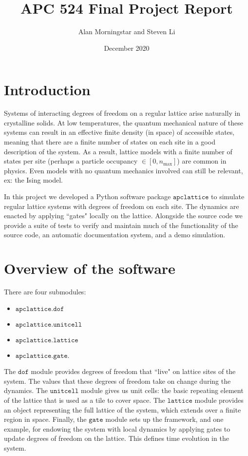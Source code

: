 \documentclass{article}
\title{APC 524 Final Project Report}
\author{Alan Morningstar and Steven Li}
\date{December 2020}
\begin{document}
\maketitle

\section{Introduction}

Systems of interacting degrees of freedom on a regular lattice arise naturally in crystalline solids. At low temperatures, the quantum mechanical nature of these systems can result in an effective finite density (in space) of accessible states, meaning that there are a finite number of states on each site in a good description of the system. As a result, lattice models with a finite number of states per site (perhaps a particle occupancy $\in [0, n_\mathrm{max}]$) are common in physics. Even models with no quantum mechanics involved can still be relevant, ex: the Ising model.

In this project we developed a Python software package $\texttt{apclattice}$ to simulate regular lattice systems with degrees of freedom on each site. The dynamics are enacted by applying ``gates" locally on the lattice. Alongside the source code we provide a suite of tests to verify and maintain much of the functionality of the source code, an automatic documentation system, and a demo simulation.

\section{Overview of the software}
There are four submodules:
\begin{itemize}
    \item $\texttt{apclattice.dof}$\\
    \item $\texttt{apclattice.unitcell}$\\
    \item $\texttt{apclattice.lattice}$\\
    \item $\texttt{apclattice.gate}$.
\end{itemize}
The $\texttt{dof}$ module provides degrees of freedom that ``live" on lattice sites of the system. The values that these degrees of freedom take on change during the dynamics. The $\texttt{unitcell}$ module gives us unit cells: the basic repeating element of the lattice that is used as a tile to cover space. The $\texttt{lattice}$ module provides an object representing the full lattice of the system, which extends over a finite region in space. Finally, the $\texttt{gate}$ module sets up the framework, and one example, for endowing the system with local dynamics by applying gates to update degrees of freedom on the lattice. This defines time evolution in the system.
\end{document}

